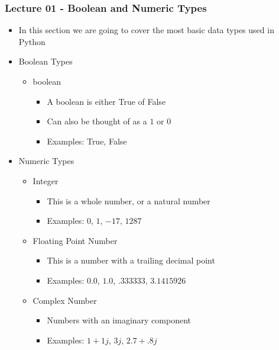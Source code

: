 \documentclass[mini frame in current subsection]{beamer}
\begin{document}
		\begin{frame}
			\frametitle{Lecture 01 - Boolean and Numeric Types}
			\begin{itemize}
				\vfill\item  In this section we are going to cover the most basic data types used in Python
				\vfill\item  Boolean Types
					\begin{itemize}
						\item  boolean
						\begin{itemize}
							\item  A boolean is either True of False
							\item  Can also be thought of as a $1$ or $0$
							\item  Examples:  True, False
						\end{itemize}
					\end{itemize}
				\vfill\item  Numeric Types
					\begin{itemize}
						\item  Integer
							\begin{itemize}
								\item  This is a whole number, or a natural number
								\item  Examples:  $0$, $1$, $-17$, $1287$
							\end{itemize}
						\item  Floating Point Number
							\begin{itemize}
								\item  This is a number with a trailing decimal point
								\item  Examples:  $0.0$, $1.0$, $.333333$, $3.1415926$
							\end{itemize}
						\item  Complex Number
							\begin{itemize}
								\item  Numbers with an imaginary component
								\item  Examples:  $1+1j$, $3j$, $2.7+.8j$
							\end{itemize}
					\end{itemize}
			\end{itemize}
		\end{frame}
		
		
	
\end{document}
